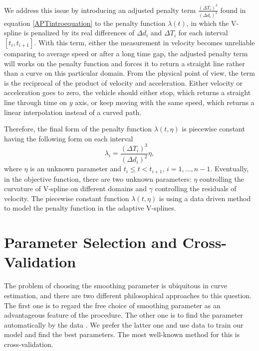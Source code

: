 We address this issue by introducing an adjusted penalty term $\frac{\left(\Delta T_i\right)^3}{\left(\Delta d_i\right)^2}$ found in equation \eqref{APTintroequation} to the penalty function $\lambda(t)$, in which the V-spline is penalized by its real differences of $\Delta d_i$ and $\Delta T_i$ for each interval $[t_i, t_{i+1}]$. With this term, either the measurement in velocity becomes unreliable comparing to average speed or after a long time gap, the adjusted penalty term will works on the penalty function and forces it to return a straight line rather than a curve on this particular domain. From the physical point of view, the term is the reciprocal of the product of velocity and acceleration. Either velocity or acceleration goes to zero, the vehicle should either stop, which returns a straight line through time on $y$ axis, or keep moving with the same speed, which returns a linear interpolation instead of a curved path. 

Therefore, the final form of the penalty function $\lambda(t,\eta)$ is piecewise constant having the following form on each interval 
\begin{equation}\label{adjustedpenalty}
\lambda_i=\frac{\left(\Delta T_i\right)^3}{\left(\Delta d_i\right)^2}\eta,
\end{equation}
where $\eta$ is an unknown parameter and $t_i\leq t < t_{i+1}$, $i=1,\ldots,n-1$. Eventually, in the objective function, there are two unknown parameters: $\eta$ controlling the curvature of V-spline on different domains and $\gamma$ controlling the residuals of velocity. The piecewise constant function $\lambda(t,\eta)$ is using a data driven method to model the penalty function in the adaptive V-splines. 




\section{Parameter Selection and Cross-Validation}

The problem of choosing the smoothing parameter is ubiquitous in curve estimation, and there are two different philosophical approaches to this question. The first one is to regard the free choice of smoothing parameter as an advantageous feature of the procedure. The other one is to find the parameter automatically by the data \citep{green1993nonparametric}. We prefer the latter one and use data to train our model and find the best parameters. The most well-known method for this is cross-validation.


